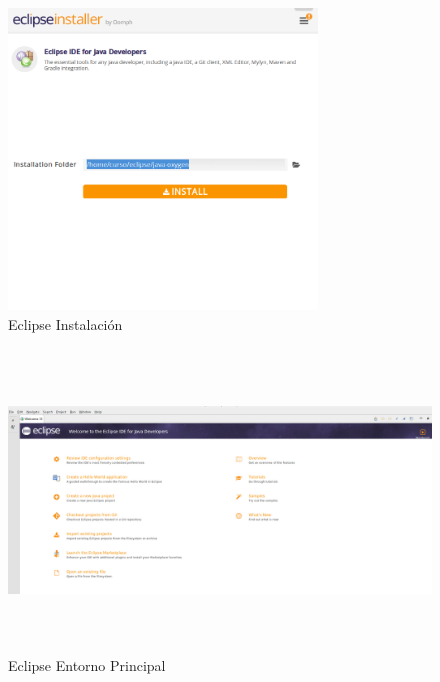 \begin{figure}[h]
 \centering
  \includegraphics[height=8cm,keepaspectratio=true,clip=true]{imagenes/Apendice/eclipse3.png}
  \caption{Eclipse Instalación}
\end{figure}

\begin{figure}[h]
 \centering
  \includegraphics[height=8cm,keepaspectratio=true,clip=true]{imagenes/Apendice/eclipse4.png}
  \caption{Eclipse Entorno Principal}
\end{figure}


